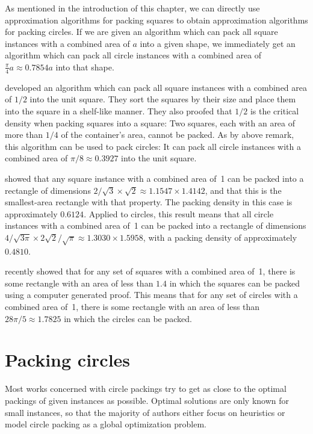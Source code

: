 \documentclass[a4paper,style=print,bibliography=totoc,nexus,lnum,extramargin]{tubsbook}
\begin{document}
As mentioned in the introduction of this chapter, we can directly use approximation algorithms for packing squares to obtain approximation algorithms for packing circles.
If we are given an algorithm which can pack all square instances with a combined area of $a$ into a given shape, we immediately get an algorithm which can pack all circle instances with a combined area of $\frac{\pi}{4}a \approx 0.7854a$ into that shape. 

\textcite{MM1967some} developed an algorithm which can pack all square instances with a combined area of $1/2$ into the unit square.
They sort the squares by their size and place them into the square in a shelf-like manner.%
They also proofed that $1/2$ is the critical density when packing squares into a square: Two squares, each with an area of more than $1/4$ of the container's area, cannot be packed.%
As by above remark, this algorithm can be used to pack circles: It can pack all circle instances with a combined area of $\pi/8 \approx 0.3927$ into the unit square.


\textcite{KK1975optimal} showed that any square instance with a combined area of~1 can be packed into a rectangle of dimensions $2/\sqrt{3} \times \sqrt{2} \approx 1.1547 \times 1.4142$, and that this is the smallest-area rectangle with that property. The packing density in this case is approximately $0.6124$. Applied to circles, this result means that all circle instances with a combined area of~1 can be packed into a rectangle of dimensions $4/\sqrt{3\pi} \times 2\sqrt{2}/\sqrt{\pi} \approx 1.3030 \times 1.5958$, with a packing density of approximately $0.4810$.

\textcite{hougardy2011packing} recently showed that for any set of squares with a combined area of~1, there is some rectangle with an area of less than $1.4$ in which the squares can be packed using a computer generated proof. This means that for any set of circles with a combined area of~1, there is some rectangle with an area of less than $28\pi/5 \approx 1.7825$ in which the circles can be packed.

\section{Packing circles}

Most works concerned with circle packings try to get as close to the optimal packings of given instances as possible. Optimal solutions are only known for small instances, so that the majority of authors either focus on heuristics or model circle packing as a global optimization problem.
\end{document}
